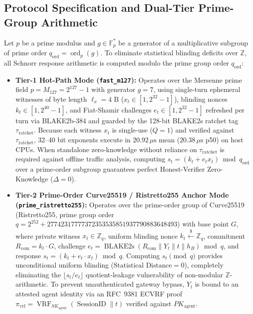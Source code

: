 \documentclass[conference,10pt]{IEEEtran}
\begin{document}
\subsection{Protocol Specification and Dual-Tier Prime-Group Arithmetic}
Let $p$ be a prime modulus and $g \in \mathbb{F}_p^*$ be a generator of a multiplicative subgroup of prime order $q_{\text{ord}} = \operatorname{ord}_p(g)$. To eliminate statistical blinding deficits over $\mathbb{Z}$, all Schnorr response arithmetic is computed modulo the prime group order $q_{\text{ord}}$:
\begin{itemize}
    \item \textbf{Tier-1 Hot-Path Mode (\texttt{fast\_m127}):} Operates over the Mersenne prime field $p = M_{127} = 2^{127} - 1$ with generator $g = 7$, using single-turn ephemeral witnesses of byte length $\ell_x = 4\text{ B}$ ($x_t \in [1, 2^{32}-1]$), blinding nonces $k_t \in [1, 2^{40}-1]$, and Fiat-Shamir challenges $e_t \in [1, 2^{32}-1]$ refreshed per turn via BLAKE2b-384 and guarded by the 128-bit BLAKE2s ratchet tag $\tau_{\text{ratchet}}$. Because each witness $x_t$ is single-use ($Q = 1$) and verified against $\tau_{\text{ratchet}}$, 32--40 bit exponents execute in $20.92\,\mu\text{s}$ mean ($20.38\,\mu\text{s}$ p50) on host CPUs. When standalone zero-knowledge without reliance on $\tau_{\text{ratchet}}$ is required against offline traffic analysis, computing $s_t = (k_t + e_t x_t) \bmod q_{\text{ord}}$ over a prime-order subgroup guarantees perfect Honest-Verifier Zero-Knowledge ($\Delta = 0$).
    \item \textbf{Tier-2 Prime-Order Curve25519 / Ristretto255 Anchor Mode (\texttt{prime\_ristretto255}):} Operates over the prime-order group of Curve25519 (Ristretto255, prime group order $q = 2^{252} + 27742317777372353535851937790883648493$) with base point $G$, where private witness $x_t \in \mathbb{Z}_q$, uniform blinding nonce $k_t \xleftarrow{\$} \mathbb{Z}_q$, commitment $R_{\text{com}} = k_t \cdot G$, challenge $e_t = \operatorname{BLAKE2s}(R_{\text{com}} \parallel Y_t \parallel t \parallel h_B) \bmod q$, and response $s_t = (k_t + e_t \cdot x_t) \bmod q$. Computing $s_t \pmod q$ provides unconditional uniform blinding ($\text{Statistical Distance} = 0$), completely eliminating the $\lfloor s_t / e_t \rfloor$ quotient-leakage vulnerability of non-modular $\mathbb{Z}$-arithmetic. To prevent unauthenticated gateway bypass, $Y_t$ is bound to an attested agent identity via an RFC~9381 ECVRF proof $\pi_{\text{vrf}} = \operatorname{VRF}_{SK_{\text{agent}}}(\operatorname{SessionID} \parallel t)$ verified against $PK_{\text{agent}}$.
\end{itemize}
\end{document}
